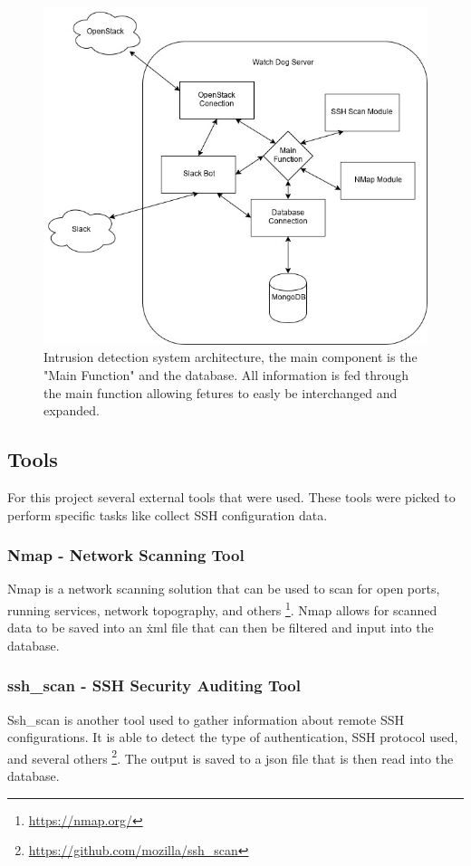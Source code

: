 \documentclass[12pt]{article}
\begin{document}
\begin{figure}[H]
    \centering
    \includegraphics[scale=.4]{./pic/Arcitecture.png}
    \caption{Intrusion detection system architecture, the main component is the "Main Function" and the database. All information is fed through the main function allowing fetures to easly be interchanged and expanded.}
\end{figure}
\newpage

\subsection{Tools}
For this project several external tools that were used. These tools were picked to perform specific tasks like collect SSH configuration data.

\subsubsection{Nmap - Network Scanning Tool}
Nmap is a network scanning solution that can be used to scan for open ports, running services, network topography, and others \footnote{\href{https://nmap.org/}{https://nmap.org/}}. Nmap allows for scanned data to be saved into an \.xml file that can then be filtered and input into the database.

\subsubsection{ssh\_scan - SSH Security Auditing Tool}
Ssh\_scan is another tool used to gather information about remote SSH configurations. It is able to detect the type of authentication, SSH protocol used, and several others \footnote{\href{https://github.com/mozilla/ssh\_scan}{https://github.com/mozilla/ssh\_scan}}. The output is saved to a json file that is then read into the database.
\end{document}
